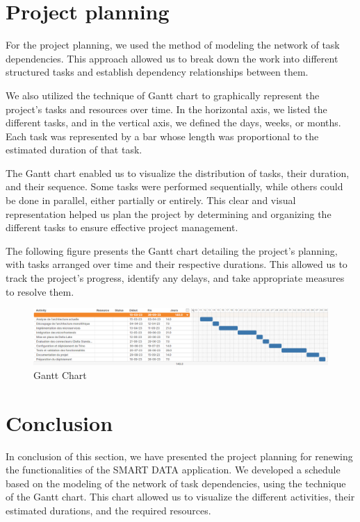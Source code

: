 \section{Project planning}
For the project planning, we used the method of modeling the network of task dependencies. This approach allowed us to break down the work into different structured tasks and establish dependency relationships between them.

We also utilized the technique of Gantt chart to graphically represent the project's tasks and resources over time. In the horizontal axis, we listed the different tasks, and in the vertical axis, we defined the days, weeks, or months. Each task was represented by a bar whose length was proportional to the estimated duration of that task.

The Gantt chart enabled us to visualize the distribution of tasks, their duration, and their sequence. Some tasks were performed sequentially, while others could be done in parallel, either partially or entirely. This clear and visual representation helped us plan the project by determining and organizing the different tasks to ensure effective project management.

The following figure presents the Gantt chart detailing the project's planning, with tasks arranged over time and their respective durations. This allowed us to track the project's progress, identify any delays, and take appropriate measures to resolve them.

\begin{figure}[H]
\centering
\includegraphics[width=\linewidth]{images/gantt.png}
\caption{Gantt Chart}\label{fig:gantt}
\end{figure}

\section*{Conclusion}

In conclusion of this section, we have presented the project planning for renewing the functionalities of the SMART DATA application. We developed a schedule based on the modeling of the network of task dependencies, using the technique of the Gantt chart. This chart allowed us to visualize the different activities, their estimated durations, and the required resources.

